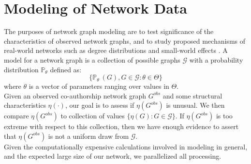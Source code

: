 \section{Modeling of Network Data}
The purposes of network graph modeling are to test significance of the characteristics of observed network graphs, and to study proposed mechanisms of real-world networks such as degree distributions and small-world effects \cite{kolaczyk_statistical_2014}. A model for a network graph is a collection of possible graphs $\mathscr{G}$ with a probability distribution $\mathbb{P}_\theta$ defined as:
\begin{equation} 
\{ \mathbb{P}_\theta\ (G), G \in \mathscr{G} : \theta \in \Theta \} 
\end{equation}
where $\theta$ is a vector of parameters ranging over values in $\Theta$.\\
Given an observed co-authorship network graph $G^{obs}$ and some structural characteristics $\eta (\cdot)$, our goal is to assess if $\eta (G^{obs})$ is unusual. We then compare $\eta (G^{obs})$ to collection of values $\{\eta(G):G \in \mathscr{G}\}$. If $\eta (G^{obs})$ is too extreme with respect to this collection, then we have enough evidence to assert that $\eta (G^{obs})$ is not a uniform draw from $\mathscr{G}$.\\
Given the computationally expensive calculations involved in modeling in general, and the expected large size of our network, we parallelized all processing.

